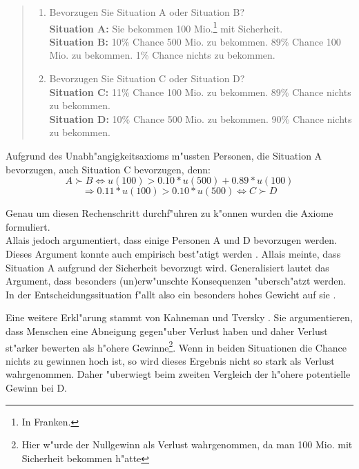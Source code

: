 \documentclass[11pt]{article}
\begin{document}
\begin{quote}
  \begin{enumerate}

  \item Bevorzugen Sie Situation A oder Situation B?\\
  \textbf{Situation A:} Sie bekommen 100 Mio.\footnote{In Franken.} mit Sicherheit.\\
  \textbf{Situation B:} 10\% Chance 500 Mio. zu bekommen. 89\% Chance 100 Mio. zu bekommen. 1\% Chance nichts zu bekommen. 
  
\item Bevorzugen Sie Situation C oder Situation D?\\
  \textbf{Situation C:} 11\% Chance 100 Mio. zu bekommen. 89\% Chance nichts zu bekommen.\\
  \textbf{Situation D:} 10\% Chance 500 Mio. zu bekommen. 90\% Chance nichts zu bekommen.
\end{enumerate}
\end{quote}
Aufgrund des Unabh"angigkeitsaxioms m"ussten Personen, die Situation A bevorzugen, auch Situation C bevorzugen, denn:
\begin{equation}\label{eq:6}
     A \succ  B \Leftrightarrow u(100) > 0.10* u(500) + 0.89* u(100) \tag{Situation A}
   \end{equation}
   \begin{equation}
     \label{eq:7}
   \Rightarrow 0.11*u(100) > 0.10*u(500) \Leftrightarrow C \succ D \tag{Situation B}     
   \end{equation}

   Genau um diesen Rechenschritt durchf"uhren zu k"onnen wurden die Axiome formuliert. \\
   Allais jedoch argumentiert, dass einige Personen A und D bevorzugen werden. Dieses Argument konnte auch empirisch best"atigt werden \parencites[S. 3;]{oliver2003quantitative}[S. 104]{osborne2004introduction}. Allais meinte, dass Situation A aufgrund der Sicherheit bevorzugt wird. Generalisiert lautet das Argument, dass besonders (un)erw"unschte Konsequenzen "ubersch"atzt werden. In der Entscheidungssituation f"allt also ein besonders hohes Gewicht auf sie \parencite[S. 697]{barbera2004handbook}. 
   
   Eine weitere Erkl"arung stammt von Kahneman und Tversky \parencite[1991, in ][S. 3]{oliver2003quantitative}. Sie argumentieren, dass Menschen eine Abneigung gegen"uber Verlust haben und daher Verlust st"arker bewerten als h"ohere Gewinne\footnote{Hier w"urde der Nullgewinn als Verlust wahrgenommen, da man 100 Mio. mit Sicherheit bekommen h"atte}. Wenn in beiden Situationen die Chance nichts zu gewinnen hoch ist, so wird dieses Ergebnis nicht so stark als Verlust wahrgenommen. Daher "uberwiegt beim zweiten Vergleich der h"ohere potentielle Gewinn bei D.
\end{document}
